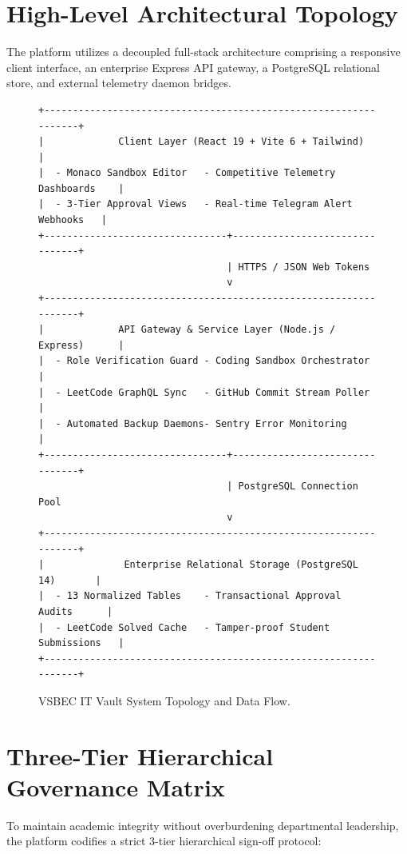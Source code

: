 \documentclass[12pt,a4paper]{report}
\begin{document}
\section{High-Level Architectural Topology}
The platform utilizes a decoupled full-stack architecture comprising a responsive client interface, an enterprise Express API gateway, a PostgreSQL relational store, and external telemetry daemon bridges.

\begin{figure}[htbp]
\centering
\footnotesize
\begin{verbatim}
+-----------------------------------------------------------------+
|             Client Layer (React 19 + Vite 6 + Tailwind)          |
|  - Monaco Sandbox Editor   - Competitive Telemetry Dashboards    |
|  - 3-Tier Approval Views   - Real-time Telegram Alert Webhooks   |
+--------------------------------+--------------------------------+
                                 | HTTPS / JSON Web Tokens
                                 v
+-----------------------------------------------------------------+
|             API Gateway & Service Layer (Node.js / Express)      |
|  - Role Verification Guard - Coding Sandbox Orchestrator        |
|  - LeetCode GraphQL Sync   - GitHub Commit Stream Poller        |
|  - Automated Backup Daemons- Sentry Error Monitoring            |
+--------------------------------+--------------------------------+
                                 | PostgreSQL Connection Pool
                                 v
+-----------------------------------------------------------------+
|              Enterprise Relational Storage (PostgreSQL 14)       |
|  - 13 Normalized Tables    - Transactional Approval Audits      |
|  - LeetCode Solved Cache   - Tamper-proof Student Submissions   |
+-----------------------------------------------------------------+
\end{verbatim}
\caption{VSBEC IT Vault System Topology and Data Flow.}
\label{fig:topology}
\end{figure}

\section{Three-Tier Hierarchical Governance Matrix}
To maintain academic integrity without overburdening departmental leadership, the platform codifies a strict 3-tier hierarchical sign-off protocol:
\end{document}
